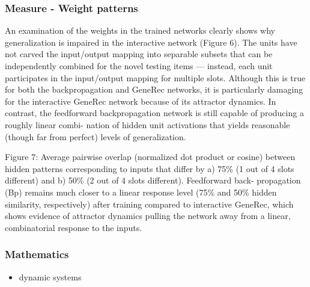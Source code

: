 \subsubsection{Measure - Weight patterns} 
An examination of the weights in the trained networks clearly shows why generalization is impaired in the
interactive network (Figure 6). The units have not carved the input/output mapping into separable subsets
that can be independently combined for the novel testing items — instead, each unit participates in the
input/output mapping for multiple slots. Although this is true for both the backpropagation and GeneRec
networks, it is particularly damaging for the interactive GeneRec network because of its attractor dynamics.
In contrast, the feedforward backpropagation network is still capable of producing a roughly linear combi-
nation of hidden unit activations that yields reasonable (though far from perfect) levels of generalization. \cite{o2001generalization} 

Figure 7: Average pairwise overlap (normalized dot product or cosine) between hidden patterns corresponding to
inputs that differ by a) 75\% (1 out of 4 slots different) and b) 50\% (2 out of 4 slots different). Feedforward back-
propagation (Bp) remains much closer to a linear response level (75\% and 50\% hidden similarity, respectively) after
training compared to interactive GeneRec, which shows evidence of attractor dynamics pulling the network away from
a linear, combinatorial response to the inputs.

\subsubsection{Mathematics} 
\begin{itemize} 
\item dynamic systems 
\end{itemize}


